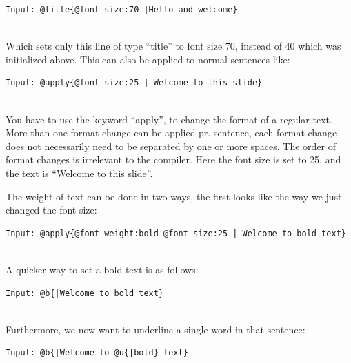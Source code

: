 \begin{verbatim}
Input: @title{@font_size:70 |Hello and welcome}
\end{verbatim}

 \\


Which sets only this line of type ``title'' to font size 70, instead of 40 which was initialized above.
This can also be applied to normal sentences like:\\

\begin{verbatim}
Input: @apply{@font_size:25 | Welcome to this slide}
\end{verbatim}

 \\

You have to use the keyword ``apply'', to change the format of a regular text. More than one format change can be applied pr. sentence, each format change does not necessarily need to be separated by one or more spaces. The order of format changes is irrelevant to the compiler. Here the font size is set to 25, and the text is ``Welcome to this slide''.

The weight of text can be done in two ways, the first looks like the way we just changed the font size:\\

\begin{verbatim}
Input: @apply{@font_weight:bold @font_size:25 | Welcome to bold text}
\end{verbatim}

 \\

A quicker way to set a bold text is as follows:\\

\begin{verbatim}
Input: @b{|Welcome to bold text}
\end{verbatim}

 \\

Furthermore, we now want to underline a single word in that sentence:\\

\begin{verbatim}
Input: @b{|Welcome to @u{|bold} text}
\end{verbatim}


